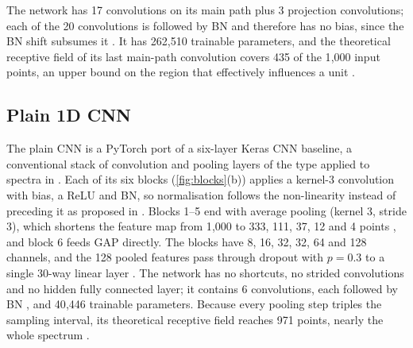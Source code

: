 \documentclass[journal,onecolumn]{IEEEtran}
\begin{document}
The network has 17 convolutions on its main path plus 3 projection
convolutions; each of the 20 convolutions is followed by BN and therefore
has no bias, since the BN shift subsumes it \cite{ioffe2015batch}. It has
262{,}510 trainable parameters, and the theoretical receptive field of its
last main-path convolution covers 435 of the 1{,}000 input points, an upper
bound on the region that effectively influences a unit
\cite{luo2016understanding}.

\subsection{Plain 1D CNN}
\label{sec:models-cnn}
The plain CNN is a PyTorch \cite{paszke2019pytorch} port of a six-layer
Keras \cite{chollet2015keras} CNN baseline, a conventional stack of
convolution and pooling layers \cite{lecun1998gradient} of the type applied
to spectra in \cite{acquarelli2017convolutional,liu2017deep}. Each of its
six blocks (\cref{fig:blocks}(b)) applies a kernel-3 convolution with
bias, a ReLU \cite{nair2010rectified} and BN, so normalisation follows the
non-linearity instead of preceding it as proposed in \cite{ioffe2015batch}.
Blocks 1--5 end with average pooling (kernel 3, stride 3), which shortens
the feature map from 1{,}000 to 333, 111, 37, 12 and 4 points
\cite{lecun1998gradient}, and block 6 feeds GAP \cite{lin2014network}
directly. The blocks have 8, 16, 32, 32, 64 and 128 channels, and the
128 pooled features pass through dropout with $p=0.3$
\cite{srivastava2014dropout} to a single 30-way linear layer
\cite{lin2014network}. The network has no shortcuts, no strided
convolutions and no hidden fully connected layer; it contains 6
convolutions, each followed by BN \cite{ioffe2015batch}, and 40{,}446
trainable parameters.
Because every pooling step triples the sampling interval, its theoretical
receptive field reaches 971 points, nearly the whole spectrum
\cite{luo2016understanding}.
\end{document}
